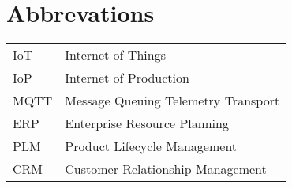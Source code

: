 \chapter*{Abbrevations}
\begin{spacing}{1.5}
\indent
\begin{tabular}{ll}
 IoT & Internet of Things \\
 IoP & Internet of Production \\
 MQTT & Message Queuing Telemetry
Transport \\
  ERP & Enterprise Resource Planning \\
  PLM & Product Lifecycle Management\\
  CRM & Customer Relationship Management\\
 
\end{tabular}   
\end{spacing}




